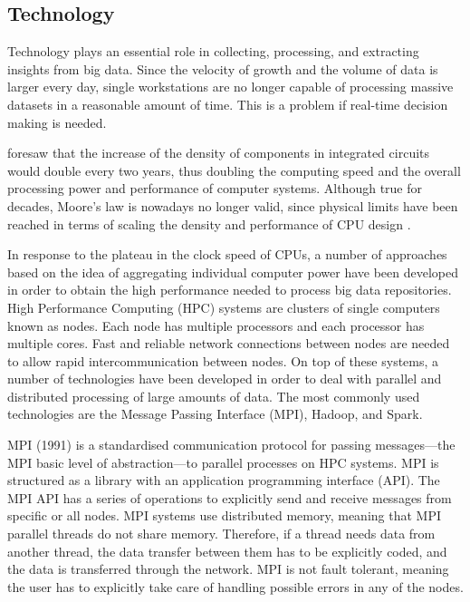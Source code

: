 \subsection{Technology}\label{section:technologies}
Technology plays an essential role in collecting, processing, and extracting insights from big data. Since the velocity of growth and the volume of data is larger every day, single workstations are no longer capable of processing massive datasets in a reasonable amount of time. This is a problem if real-time decision making is needed.

\textcite{moore65cramming} foresaw that the increase of the density of components in integrated circuits would double every two years, thus doubling the computing speed and the overall processing power and performance of computer systems. Although true for decades, Moore's law is nowadays no longer valid, since physical limits have been reached in terms of scaling the density and performance of CPU design \autocite{sheu15ep1}.

In response to the plateau in the clock speed of CPUs, a number of approaches based on the idea of aggregating individual computer power have been developed in order to obtain the high performance needed to process big data repositories.
High Performance Computing (HPC) systems are clusters of single computers known as nodes. Each node has multiple processors and each processor has multiple cores. 
Fast and reliable network connections between nodes are needed to allow rapid intercommunication between nodes.
On top of these systems, a number of technologies have been developed in order to deal with parallel and distributed processing of large amounts of data. The most commonly used technologies are the Message Passing Interface (MPI), Hadoop, and Spark.

MPI (1991) is a standardised communication protocol for passing mes\-sages---the MPI basic level of abstraction---to parallel processes on HPC systems. MPI is structured as a library with an application programming interface (API). The MPI API has a series of operations to explicitly send and receive messages from specific or all nodes. 
MPI systems use distributed memory, meaning that MPI parallel threads do not share memory. Therefore, if a thread needs data from another thread, the data transfer between them has to be explicitly coded, and the data is transferred through the network. 
MPI is not fault tolerant, meaning the user has to explicitly take care of handling possible errors in any of the nodes.

